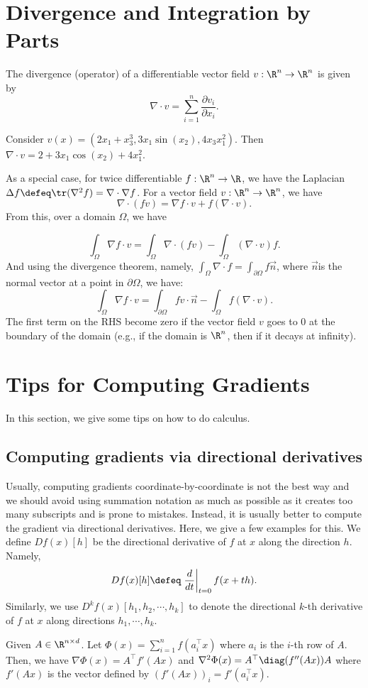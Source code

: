 
\section{Divergence and Integration by Parts}

The divergence (operator) of a differentiable vector field $v:\R^{n}\rightarrow\R^{n}$
is given by
\[
\nabla\cdot v=\sum_{i=1}^{n}\frac{\partial v_{i}}{\partial x_{i}}.
\]

\begin{example}
Consider $v(x)=(2x_{1}+x_{3}^{3},3x_{1}\sin(x_{2}),4x_{3}x_{1}^{2})$.
Then $\nabla\cdot v=2+3x_{1}\cos(x_{2})+4x_{1}^{2}$. 
\end{example}

As a special case, for twice differentiable $f:\R^{n}\rightarrow\R$,
we have the Laplacian $\Delta f\defeq\tr(\nabla^{2}f)=\nabla\cdot\nabla f$.
For a vector field $v:\R^{n}\rightarrow\R^{n}$, we have 
\[
\nabla\cdot(fv)=\nabla f\cdot v+f(\nabla\cdot v).
\]
From this, over a domain $\Omega$, we have

\[
\int_{\Omega}\nabla f\cdot v=\int_{\Omega}\nabla\cdot(fv)-\int_{\Omega}(\nabla\cdot v)f.
\]
And using the divergence theorem, namely, $\int_{\Omega}\nabla\cdot f=\int_{\partial\Omega}f\overrightarrow{n}$,
where $\overrightarrow{n}$is the normal vector at a point in $\partial\Omega$,
we have:
\[
\int_{\Omega}\nabla f\cdot v=\int_{\partial\Omega}fv\cdot\overrightarrow{n}-\int_{\Omega}f(\nabla\cdot v).
\]
The first term on the RHS become zero if the vector field $v$ goes
to $0$ at the boundary of the domain (e.g., if the domain is $\R^{n}$,
then if it decays at infinity). 

\section{Tips for Computing Gradients}

In this section, we give some tips on how to do calculus.

\subsection{Computing gradients via directional derivatives}

Usually, computing gradients coordinate-by-coordinate is not the best
way and we should avoid using summation notation as much as possible
as it creates too many subscripts and is prone to mistakes. Instead,
it is usually better to compute the gradient via directional derivatives.
Here, we give a few examples for this. We define $Df(x)[h]$ be the
directional derivative of $f$ at $x$ along the direction $h$. Namely,
\[
Df(x)[h]\defeq\left.\frac{d}{dt}\right|_{t=0}f(x+th).
\]
Similarly, we use $D^{k}f(x)[h_{1},h_{2},\cdots,h_{k}]$ to denote
the directional $k$-th derivative of $f$ at $x$ along directions
$h_{1},\cdots,h_{k}$.
\begin{lem}
Given $A\in\R^{n\times d}$. Let $\Phi(x)=\sum_{i=1}^{n}f(a_{i}^{\top}x)$
where $a_{i}$ is the $i$-th row of $A$. Then, we have $\nabla\Phi(x)=A^{\top}f'(Ax)$
and $\nabla^{2}\Phi(x)=A^{\top}\diag(f''(Ax))A$ where $f'(Ax)$ is
the vector defined by $(f'(Ax))_{i}=f'(a_{i}^{\top}x)$.
\end{lem}

